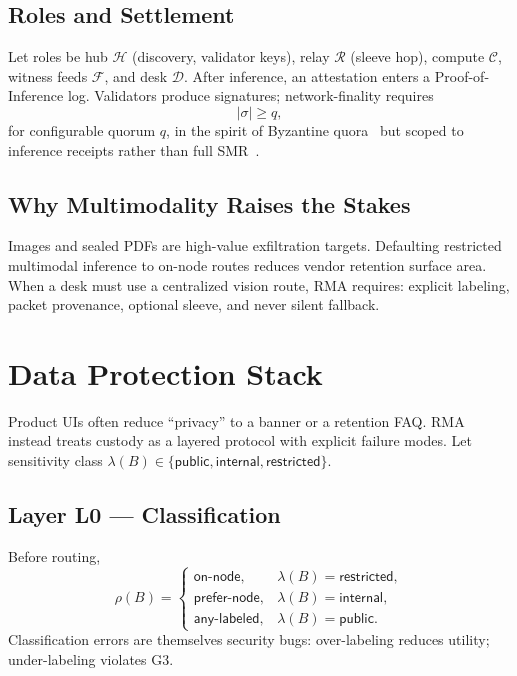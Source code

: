 \documentclass[journal,10pt,twocolumn,a4paper]{IEEEtran}
\begin{document}
\subsection{Roles and Settlement}
Let roles be hub $\mathcal{H}$ (discovery, validator keys), relay $\mathcal{R}$ (sleeve hop), compute $\mathcal{C}$, witness feeds $\mathcal{F}$, and desk $\mathcal{D}$.
After inference, an attestation enters a Proof-of-Inference log.
Validators produce signatures; network-finality requires
\begin{equation}
\lvert\sigma\rvert \ge q,
\end{equation}
for configurable quorum $q$, in the spirit of Byzantine quora~\cite{castro1999pbft} but scoped to inference receipts rather than full SMR~\cite{nakamoto2008bitcoin}.

\subsection{Why Multimodality Raises the Stakes}
Images and sealed PDFs are high-value exfiltration targets.
Defaulting restricted multimodal inference to on-node routes reduces vendor retention surface area.
When a desk must use a centralized vision route, RMA requires: explicit labeling, packet provenance, optional sleeve, and never silent fallback.

\section{Data Protection Stack}
\label{sec:protect}

Product UIs often reduce ``privacy'' to a banner or a retention FAQ.
RMA instead treats custody as a layered protocol with explicit failure modes.
Let sensitivity class $\lambda(B)\in\{\mathsf{public},\mathsf{internal},\mathsf{restricted}\}$.

\subsection{Layer L0 --- Classification}
Before routing,
\begin{equation}
\rho(B)=
\begin{cases}
\mathsf{on\text{-}node}, & \lambda(B)=\mathsf{restricted},\\
\mathsf{prefer\text{-}node}, & \lambda(B)=\mathsf{internal},\\
\mathsf{any\text{-}labeled}, & \lambda(B)=\mathsf{public}.
\end{cases}
\end{equation}
Classification errors are themselves security bugs: over-labeling reduces utility; under-labeling violates G3.
\end{document}
